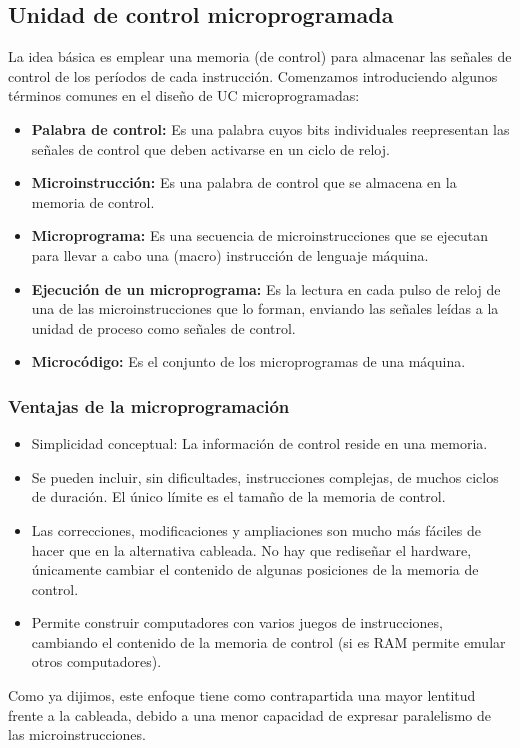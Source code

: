 \subsection{Unidad de control microprogramada}
La idea básica es emplear una memoria (de control) para almacenar las señales de control de los períodos de cada instrucción. Comenzamos introduciendo 
algunos términos comunes en el diseño de UC microprogramadas:
\begin{itemize}
    \item \textbf{Palabra de control:} Es una palabra cuyos bits individuales reepresentan las señales de control que deben activarse en un ciclo de reloj.
    \item \textbf{Microinstrucción:} Es una palabra de control que se almacena en la memoria de control.
    \item \textbf{Microprograma:} Es una secuencia de microinstrucciones que se ejecutan para llevar a cabo una 
        (macro) instrucción de lenguaje máquina.
    \item \textbf{Ejecución de un microprograma:} Es la lectura en cada pulso de reloj de una de las microinstrucciones que lo forman, enviando las señales leídas a la unidad
        de proceso como señales de control.
    \item \textbf{Microcódigo:} Es el conjunto de los microprogramas de una máquina.
\end{itemize}
\subsubsection*{Ventajas de la microprogramación}
\begin{itemize}
    \item Simplicidad conceptual: La información de control reside en una memoria.
    \item Se pueden incluir, sin dificultades, instrucciones complejas, de muchos ciclos de duración. El único límite es el tamaño de la memoria de control.
    \item Las correcciones, modificaciones y ampliaciones son mucho más fáciles de hacer que en la alternativa cableada. No hay que rediseñar el hardware, únicamente cambiar el contenido de algunas posiciones de la memoria de control.
    \item Permite construir computadores con varios juegos de instrucciones, cambiando el contenido de la memoria de control (si es RAM permite emular otros computadores).
\end{itemize}
Como ya dijimos, este enfoque tiene como contrapartida una mayor lentitud frente a la cableada, debido a una menor capacidad de expresar paralelismo de las microinstrucciones.
